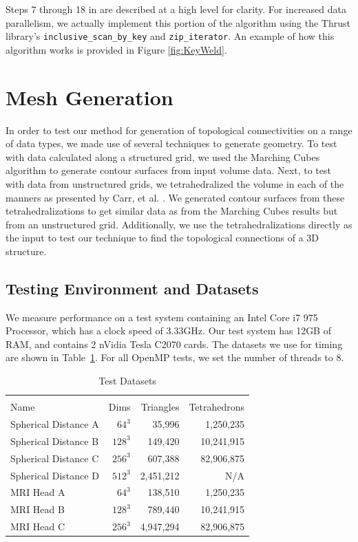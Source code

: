 \documentclass[review,journal]{vgtc}         %
\begin{document}
Steps 7 through 18 in  are described at a high level for clarity. For increased data parallelism, we actually implement this portion of the algorithm using the Thrust library's \texttt{inclusive\_scan\_by\_key} and \texttt{zip\_iterator}. An example of how this algorithm works is provided in Figure \ref{fig:KeyWeld}.


\section{Mesh Generation}
In order to test our method for generation of topological connectivities on a range of data types, we made use of several techniques to generate geometry.
To test with data calculated along a structured grid, we used the Marching Cubes algorithm to generate contour surfaces from input volume data. Next, to test
with data from unstructured grids, we tetrahedralized the volume in each of the manners as presented by Carr, et al. \cite{Carr2006}. We generated contour surfaces from these tetrahedralizations
to get similar data as from the Marching Cubes results but from an unstructured grid. Additionally, we use the tetrahedralizations directly as the input to test our technique
to find the topological connections of a 3D structure.


\subsection{Testing Environment and Datasets}

We measure performance on a test system containing an Intel Core i7 975 Processor, which has a clock speed of 3.33GHz. Our test system has 12GB of RAM, and contains 2 nVidia Tesla C2070 cards. The datasets we use for timing are shown in Table~\ref{tab:datasets}. For all OpenMP tests, we set the number of threads to 8.


\begin{table}[tb!]
\begin{center}
\caption{Test Datasets}
\label{tab:datasets}
\begin{tabular}{l r r r}
\multicolumn{4}{c}{ } \\
Name & Dims &  Triangles & Tetrahedrons \\
\hline
Spherical Distance A & $64^3 $ & 35,996    & 1,250,235 \\
Spherical Distance B & $128^3$ & 149,420   & 10,241,915 \\
Spherical Distance C & $256^3$ & 607,388   & 82,906,875 \\
Spherical Distance D & $512^3$ & 2,451,212 & N/A \\
MRI Head A           & $64^3 $ & 138,510   & 1,250,235 \\
MRI Head B           & $128^3$ & 789,440   & 10,241,915 \\
MRI Head C           & $256^3$ & 4,947,294 & 82,906,875  \\
\end{tabular}
\end{center}
\end{table}
\end{document}
